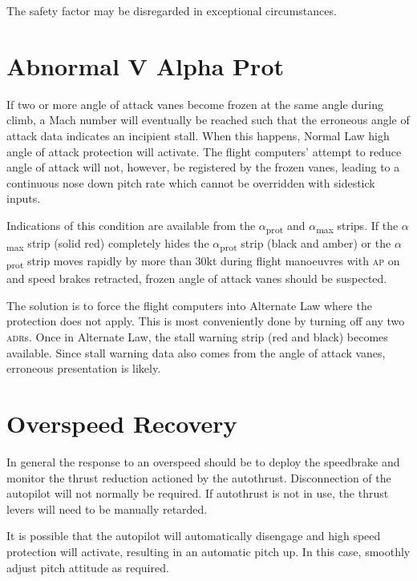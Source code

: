 \documentclass[a5paper,11pt,twoside]{book}
\newcommand{\ac}[1]{{\scshape\MakeLowercase{#1}}}
\newcommand{\inlcite}[1]{{\ac{#1}}}
\newcommand{\multicite}[1]{%
  \nopagebreak
  \noindent{{\color{blue}\footnotesize[ \inlcite{#1} ]}}
}
\begin{document}
The safety factor may be disregarded in exceptional circumstances.

\multicite{QRH~IFP, FCOM~PER.LDG, EOMB~4.14.2}

\section{Abnormal V Alpha Prot}

If two or more angle of attack vanes become frozen at the same angle during
climb, a Mach number will eventually be reached such that the erroneous angle of
attack data indicates an incipient stall. When this happens, Normal Law high
angle of attack protection will activate. The flight computers' attempt to
reduce angle of attack will not, however, be registered by the frozen vanes,
leading to a continuous nose down pitch rate which cannot be overridden with
sidestick inputs.

Indications of this condition are available from the
$\alpha$\textsubscript{prot} and $\alpha$\textsubscript{max} strips. If the
$\alpha$\textsubscript{max} strip (solid red) completely hides the
$\alpha$\textsubscript{prot} strip (black and amber) or the
$\alpha$\textsubscript{prot} strip moves rapidly by more than 30kt during flight
manoeuvres with \ac{AP} on and speed brakes retracted, frozen angle of attack
vanes should be suspected.

The solution is to force the flight computers into Alternate Law where the
protection does not apply. This is most conveniently done by turning off any two
\ac{ADR}s. Once in Alternate Law, the stall warning strip (red and black)
becomes available. Since stall warning data also comes from the angle of attack
vanes, erroneous presentation is likely.

\section{Overspeed Recovery}

In general the response to an overspeed should be to deploy the speedbrake and
monitor the thrust reduction actioned by the autothrust. Disconnection of the
autopilot will not normally be required. If autothrust is not in use, the thrust
levers will need to be manually retarded.

It is possible that the autopilot will automatically disengage and high speed
protection will activate, resulting in an automatic pitch up. In this case,
smoothly adjust pitch attitude as required.
\end{document}
